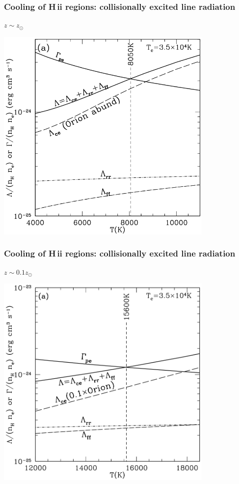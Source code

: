\begin{frame}
\end{frame} \begin{frame}\frametitle{Cooling of H\,{\sc ii} regions: collisionally excited line radiation}
$z \sim z_{\odot}$
\begin{center}
\includegraphics[width=0.8\textwidth,height=!]{./B/heating_cooling.png}
\end{center}


\end{frame} \begin{frame}\frametitle{Cooling of H\,{\sc ii} regions: collisionally excited line radiation}
$z \sim 0.1 z_{\odot}$
\begin{center}
\includegraphics[width=0.8\textwidth,height=!]{./B/cooling_01.png}
\end{center}




\end{frame}
